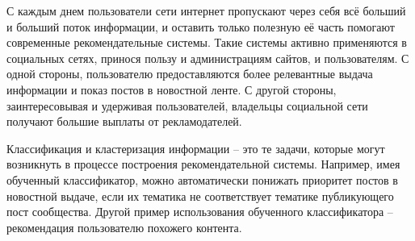 \indent
С каждым днем пользователи сети интернет пропускают через себя всё больший и больший поток информации, и оставить только полезную её часть помогают современные рекомендательные системы. Такие системы активно применяются в социальных сетях, принося пользу и администрациям сайтов, и пользователям. С одной стороны, пользователю предоставляются более релевантные выдача информации и показ постов в новостной ленте. С другой стороны, заинтересовывая и удерживая пользователей, владельцы социальной сети получают большие выплаты от рекламодателей.

\indent
Классификация и кластеризация информации – это те задачи, которые могут возникнуть в процессе построения рекомендательной системы. Например, имея обученный классификатор, можно автоматически понижать приоритет постов в новостной выдаче, если их тематика не соответствует тематике публикующего пост сообщества. Другой пример использования обученного классификатора – рекомендация пользователю похожего контента.
